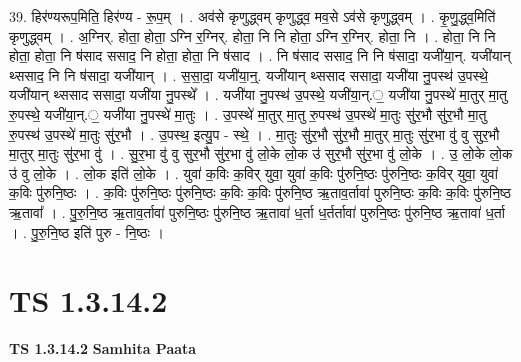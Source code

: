 \documentclass[17pt]{extarticle}
\begin{document}
39. हिर॑ण्यरूप॒मिति॒ हिर॑ण्य - रू॒प॒म् । . अव॑से कृणुद्ध्वम् कृणुद्ध्व॒ मव॒से ऽव॑से कृणुद्ध्वम् । . कृ॒णु॒द्ध्व॒मिति॑ कृणुद्ध्वम् । . अ॒ग्निर्. होता॒ होता॒ ऽग्नि र॒ग्निर्. होता॒ नि नि होता॒ ऽग्नि र॒ग्निर्. होता॒ नि । . होता॒ नि नि होता॒ होता॒ नि ष॑साद ससाद॒ नि होता॒ होता॒ नि ष॑साद । . नि ष॑साद ससाद॒ नि नि ष॑सादा॒ यजी॑या॒न्. यजी॑यान् थ्ससाद॒ नि नि ष॑सादा॒ यजी॑यान् । . स॒सा॒दा॒ यजी॑या॒न्॒. यजी॑यान् थ्ससाद ससादा॒ यजी॑या नु॒पस्थ॑ उ॒पस्थे॒ यजी॑यान् थ्ससाद ससादा॒ यजी॑या नु॒पस्थे᳚ । . यजी॑या नु॒पस्थ॑ उ॒पस्थे॒ यजी॑या॒न्.॒ यजी॑या नु॒पस्थे॑ मा॒तुर् मा॒तु रु॒पस्थे॒ यजी॑या॒न्.॒ यजी॑या नु॒पस्थे॑ मा॒तुः । . उ॒पस्थे॑ मा॒तुर् मा॒तु रु॒पस्थ॑ उ॒पस्थे॑ मा॒तुः सु॑र॒भौ सु॑र॒भौ मा॒तु रु॒पस्थ॑ उ॒पस्थे॑ मा॒तुः सु॑र॒भौ । . उ॒पस्थ॒ इत्यु॒प - स्थे॒ । . मा॒तुः सु॑र॒भौ सु॑र॒भौ मा॒तुर् मा॒तुः सु॑र॒भा वु॑ वु सुर॒भौ मा॒तुर् मा॒तुः सु॑र॒भा वु॑ । . सु॒र॒भा वु॑ वु सुर॒भौ सु॑र॒भा वु॑ लो॒के लो॒क उ॑ सुर॒भौ सु॑र॒भा वु॑ लो॒के । . उ॒ लो॒के लो॒क उ॑ वु लो॒के । . लो॒क इति॑ लो॒के । . युवा॑ क॒विः क॒विर् युवा॒ युवा॑ क॒विः पु॑रुनि॒ष्ठः पु॑रुनि॒ष्ठः क॒विर् युवा॒ युवा॑ क॒विः पु॑रुनि॒ष्ठः । . क॒विः पु॑रुनि॒ष्ठः पु॑रुनि॒ष्ठः क॒विः क॒विः पु॑रुनि॒ष्ठ ऋ॒ताव॒र्तावा॑ पुरुनि॒ष्ठः क॒विः क॒विः पु॑रुनि॒ष्ठ ऋ॒तावा᳚ । . पु॒रु॒नि॒ष्ठ ऋ॒ताव॒र्तावा॑ पुरुनि॒ष्ठः पु॑रुनि॒ष्ठ ऋ॒तावा॑ ध॒र्ता ध॒र्तर्तावा॑ पुरुनि॒ष्ठः पु॑रुनि॒ष्ठ ऋ॒तावा॑ ध॒र्ता । . पु॒रु॒नि॒ष्ठ इति॑ पुरु - नि॒ष्ठः । \newline
\pagebreak
{}

\section{ TS 1.3.14.2 }

\textbf{TS 1.3.14.2 } \newline
\textbf{Samhita Paata} \newline
\end{document}
